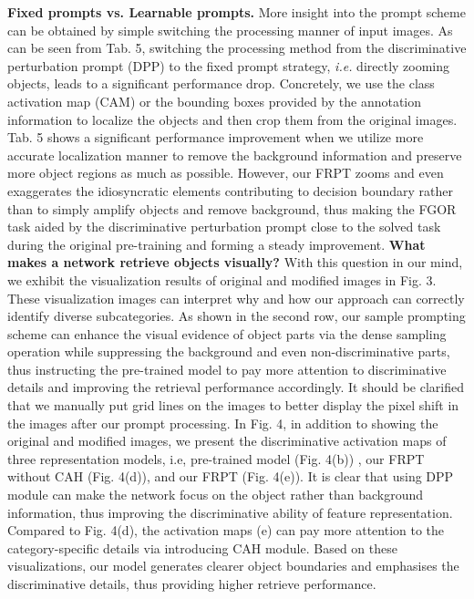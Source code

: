 \documentclass[letterpaper]{article} %
\begin{document}
\textbf{Fixed prompts vs. Learnable prompts.} More insight into the prompt scheme can be obtained by simple switching the processing manner of input images. As can be seen from Tab. 5, switching the processing method from the discriminative perturbation prompt (DPP) to the fixed prompt strategy, \textit{i.e.} directly zooming objects, leads to a significant performance drop.
Concretely, we use the class activation map (CAM) or the bounding boxes provided by the annotation information to localize the objects and then crop them from the original images. Tab. 5 shows a significant performance improvement when we utilize more accurate localization manner to remove the background information and preserve more object regions as much as possible. However, our FRPT zooms and even exaggerates the idiosyncratic elements contributing to decision boundary rather than to simply amplify objects and remove background, thus making the FGOR task aided by the discriminative perturbation prompt close to the solved task during the original pre-training and forming a steady improvement.  \textbf{What makes a network retrieve objects visually?} With this question in our mind, we exhibit the visualization results of original and modified images in Fig. 3. These visualization images can interpret why and how our approach can correctly identify diverse subcategories. As shown in the second row, our sample prompting scheme can enhance the visual evidence of object parts via the dense sampling operation while suppressing the background and even non-discriminative parts, thus instructing the pre-trained model to pay more attention to discriminative details and improving the retrieval performance accordingly.
It should be clarified that we manually put grid lines on the images to better display the pixel shift in the images after our prompt processing. In Fig. 4, in addition to showing the original and modified images, we present the discriminative activation maps of three representation models, i.e, pre-trained model (Fig. 4(b)) , our FRPT without CAH (Fig. 4(d)), and our FRPT (Fig. 4(e)). It is clear that using DPP module can make the network focus on the object rather than background information, thus improving the discriminative ability of feature representation. Compared to Fig. 4(d), the activation maps (e) can pay more attention to the category-specific details via introducing CAH module. Based on these visualizations, our model generates clearer object boundaries and emphasises the discriminative details, thus providing higher retrieve performance.
\end{document}
